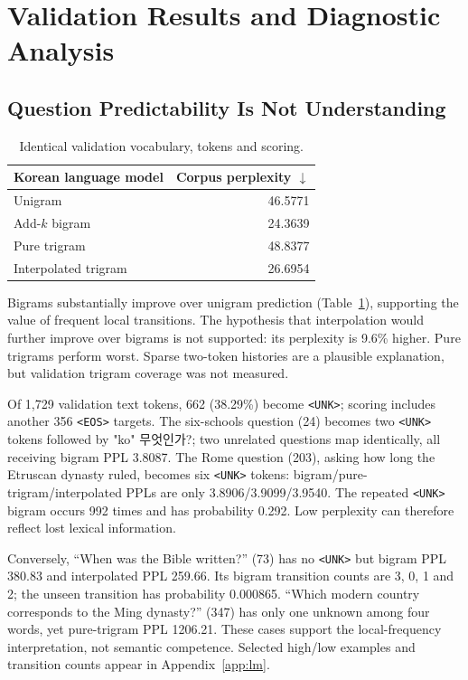 \documentclass[11pt]{article}
\newcommand{\KO}[1]{{\koreanfont\XeTeXlinebreaklocale "ko" #1}}
\newcommand{\unk}{\texttt{<UNK>}}
\newcommand{\eos}{\texttt{<EOS>}}
\begin{document}
\section{Validation Results and Diagnostic Analysis}
\subsection{Question Predictability Is Not Understanding}
\begin{table}[t]
\centering\small
\begin{tabular}{lr}
\toprule
Korean language model & Corpus perplexity $\downarrow$\\
\midrule
Unigram & 46.5771\\
Add-$k$ bigram & 24.3639\\
Pure trigram & 48.8377\\
Interpolated trigram & 26.6954\\
\bottomrule
\end{tabular}
\caption{Identical validation vocabulary, tokens and scoring.}
\label{tab:lm}
\end{table}
Bigrams substantially improve over unigram prediction (Table~\ref{tab:lm}), supporting the value of frequent local transitions. The hypothesis that interpolation would further improve over bigrams is not supported: its perplexity is 9.6\% higher. Pure trigrams perform worst. Sparse two-token histories are a plausible explanation, but validation trigram coverage was not measured.

Of 1,729 validation text tokens, 662 (38.29\%) become \unk{}; scoring includes another 356 \eos{} targets. The six-schools question (24) becomes two \unk{} tokens followed by \KO{무엇인가?}; two unrelated questions map identically, all receiving bigram PPL 3.8087. The Rome question (203), asking how long the Etruscan dynasty ruled, becomes six \unk{} tokens: bigram/pure-trigram/interpolated PPLs are only 3.8906/3.9099/3.9540. The repeated \unk{} bigram occurs 992 times and has probability 0.292. Low perplexity can therefore reflect lost lexical information.

Conversely, ``When was the Bible written?'' (73) has no \unk{} but bigram PPL 380.83 and interpolated PPL 259.66. Its bigram transition counts are 3, 0, 1 and 2; the unseen transition has probability 0.000865. ``Which modern country corresponds to the Ming dynasty?'' (347) has only one unknown among four words, yet pure-trigram PPL 1206.21. These cases support the local-frequency interpretation, not semantic competence. Selected high/low examples and transition counts appear in Appendix~\ref{app:lm}.
\end{document}
